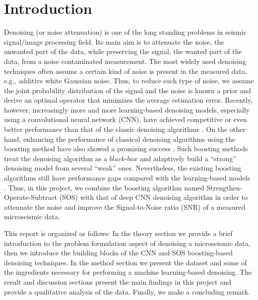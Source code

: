 \documentclass[a4paper]{article}
\begin{document}
\newpage

\newcommand{\half}{\frac{1}{2}}
\newcommand{\dx}{{\Delta x}}
\newcommand{\bigO}{{\mathcal{O}}}

\section{Introduction}

Denoising (or noise attenuation) is one of the long standing problems in seismic signal/image processing field. Its main aim is to attenuate the noise, the unwanted part of the data, while preserving the signal, the wanted part of the data, from a noise contaminated measurement. The most widely used denoising techniques often assume a certain kind of noise is present in the measured data, e.g., additive white Gaussian noise. Thus, to reduce such type of noise, we assume the joint probability distribution of the signal and the noise is known a prior and derive an optimal operator that minimizes the average estimation error. Recently, however, increasingly more and more learning-based denoising models, especially using a convolutional neural network (CNN), have achieved competitive or even better performance than that of the classic denoising algorithms \cite{ChenXTW18} \cite{ZhangZCM017}. On the other hand, enhancing the performance of classical denoising algorithms using the boosting method have also showed a promising success \cite{RomanoE15}. Such boosting methods treat the denoising algorithm as a $\textit{black-box}$ and adaptively build a “strong” denoising model from several “weak” ones. Nevertheless, the existing boosting algorithms still have performance gaps compared with the learning-based models \cite{ChenXTW18}. Thus, in this project, we combine the boosting algorithm named Strengthen-Operate-Subtract (SOS) \cite{RomanoE15} with that of deep CNN denoising algorithm in order to attenuate the noise and improve the Signal-to-Noise ratio (SNR) of a measured microseismic data.

This report is organized as follows: In the theory section we provide a brief introduction to the problem formulation aspect of denoising a microseismic data, then we introduce the building blocks of the CNN and SOS boosting-based denoising techniques. In the method section we present the dataset and some of the ingredients necessary for performing a machine learning-based denoising. The result and discussion sections present the main findings in this project and provide a qualitative analysis of the data. Finally, we make a concluding remark.
\end{document}
